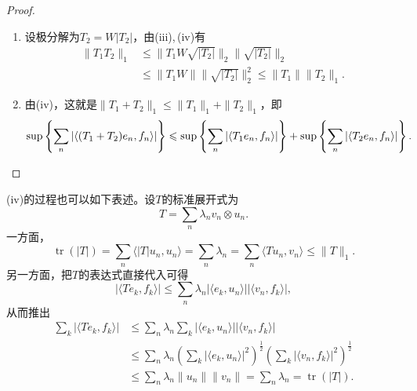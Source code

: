 \begin{proof}
\begin{enumerate}[label=(\roman*)]
\begin{align*}
        &\leqslant\big\|\sqrt{|T|}\big\|_2\big\|\sqrt{|T|}W^*\big\|_2
        \leqslant\big\|\sqrt{|T|}\big\|_2^2,
    \end{align*}
    并且（任取$H$的一组标准正交基$\{h_n\}$）
    \[\big\|\sqrt{|T|}\big\|_2^2=\sum_n\big\|\sqrt{|T|}h_n\big\|^2
    =\sum_n\langle|T|h_n,h_n\rangle=\operatorname{tr}(|T|),\]
    对$\{e_n\},\{f_n\}$取上确界就有$\|T\|_1\leqslant\operatorname{tr}(|T|)$。
    \item 设极分解为$T_2=W|T_2|$，由(iii),\,(iv)有
    \begin{align*}
        \|T_1T_2\|_1&\leqslant\big\|T_1W\sqrt{|T_2|}\big\|_2\big\|\sqrt{|T_2|}\big\|_2\\
        &\leqslant\|T_1W\|\big\|\sqrt{|T_2|}\big\|_2^2\leqslant\|T_1\|\|T_2\|_1.
    \end{align*}
    \item 由(iv)，这就是$\|T_1+T_2\|_1\leqslant\|T_1\|_1+\|T_2\|_1$，即
    \[\sup\left\{\sum_n|\langle(T_1+T_2)e_n,f_n\rangle|\right\}
    \leqslant\sup\left\{\sum_n|\langle T_1e_n,f_n \rangle|\right\}
    +\sup\left\{\sum_n|\langle T_2e_n,f_n \rangle|\right\}.\qedhere\]
    \end{enumerate}
\end{proof}
\begin{remark*}
    (iv)的过程也可以如下表述。设$T$的标准展开式为
    \[T=\sum_n\lambda_n v_n \otimes u_n.\]
    一方面，
    \[\operatorname{tr}(|T|)=\sum_n\langle|T|u_n,u_n\rangle
    =\sum_n\lambda_n=\sum_n\langle Tu_n,v_n \rangle\leqslant\|T\|_1.\]
    另一方面，把$T$的表达式直接代入可得
    \[|\langle Te_k,f_k \rangle|\leqslant\sum_n\lambda_n
    |\langle e_k,u_n \rangle||\langle v_n,f_k \rangle|,\]
    从而推出
    \begin{align*}
        \sum_k|\langle Te_k,f_k \rangle|&\leqslant\sum_n\lambda_n
        \sum_k|\langle e_k,u_n \rangle||\langle v_n,f_k \rangle|\\
        &\leqslant\sum_n\lambda_n\left(\sum_k|\langle e_k,u_n \rangle|^2\right)^\frac{1}{2}
        \left(\sum_k|\langle v_n,f_k \rangle|^2\right)^\frac{1}{2}\\
        &\leqslant\sum_n\lambda_n\|u_n\|\|v_n\|
        =\sum_n\lambda_n=\operatorname{tr}(|T|).
    \end{align*}
\end{remark*}

